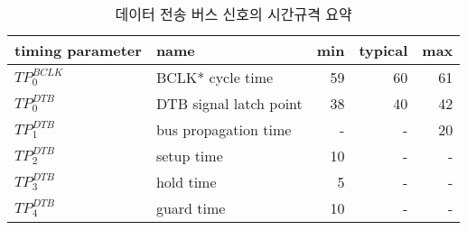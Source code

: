 %
%
\begin{table}[htbp]
\caption{데이터 전송 버스 신호의 시간규격 요약}\label{table:dtb-time}
   \begin{center}
   \begin{tabular}{|l|l|r|r|r|} \hline
	timing parameter & name & min & typical & max \\ \hline \hline
	$TP^{BCLK}_0$ & BCLK* cycle time & 59 & 60 & 61 \\ \hline
	$TP^{DTB}_0$  & DTB signal latch point & 38 & 40 & 42 \\ \hline
	$TP^{DTB}_1$  & bus propagation time & - & - & 20 \\ \hline
	$TP^{DTB}_2$  & setup time & 10 & - & - \\ \hline
	$TP^{DTB}_3$  & hold time & 5 & - & - \\ \hline
	$TP^{DTB}_4$  & guard time & 10 & - & - \\ \hline
   \end{tabular}
   \end{center}
\end{table}
%
%
